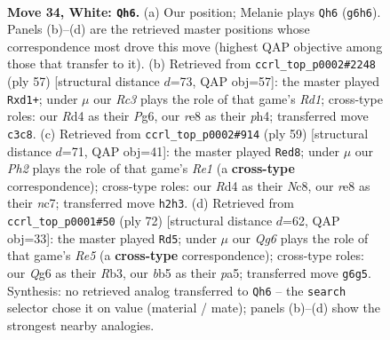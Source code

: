 \documentclass[11pt]{article}
\begin{document}
\clearpage

\begin{figure}[p]\centering
\begin{subfigure}{0.46\textwidth}\centering
\resizebox{\linewidth}{!}{%
\newchessgame
\chessboard[
  setfen={4rn2/kp2p3/1r1p2Q1/1b4p1/3RP3/1PR2P2/6PP/1K6 w - - 1 34},
  showmover=false,
  pgfstyle=straightmove, color=movearrow, markmove={g6-h6}
]}
\caption{}
\end{subfigure}\hfill
\begin{subfigure}{0.46\textwidth}\centering
\resizebox{\linewidth}{!}{%
\newchessgame
\chessboard[
  setfen={3r2k1/pp3pp1/6p1/6P1/1P2pq1P/8/P3NPB1/R2R1K2 b - - 1 29},
  showmover=false,
  pgfstyle=straightmove, color=movearrow, markmove={d8-d1}
]}
\caption{}
\end{subfigure}
\\[4pt]
\begin{subfigure}{0.46\textwidth}\centering
\resizebox{\linewidth}{!}{%
\newchessgame
\chessboard[
  setfen={2n1r1k1/1pNr2pp/p2P4/4pp2/8/5P2/1P4PP/2RR2K1 b - - 6 30},
  showmover=false,
  pgfstyle=straightmove, color=movearrow, markmove={e8-d8}
]}
\caption{}
\end{subfigure}\hfill
\begin{subfigure}{0.46\textwidth}\centering
\resizebox{\linewidth}{!}{%
\newchessgame
\chessboard[
  setfen={1r4k1/1r4p1/5p1p/pp2R3/8/PR2P2P/5PP1/7K w - - 0 37},
  showmover=false,
  pgfstyle=straightmove, color=movearrow, markmove={e5-d5}
]}
\caption{}
\end{subfigure}
\caption{\textbf{Move 34, White: \texttt{Qh6}.} (a) Our position; Melanie plays \texttt{Qh6} (\texttt{g6h6}). Panels (b)--(d) are the retrieved master positions whose correspondence most drove this move (highest QAP objective among those that transfer to it). (b) Retrieved from \texttt{ccrl\_top\_p0002\#2248} (ply 57) [structural distance $d$=73, QAP obj=57]: the master played \texttt{Rxd1+}; under $\mu$ our \emph{Rc3} plays the role of that game's \emph{Rd1}; cross-type roles: our \emph{R}d4 as their \emph{P}g6, our \emph{r}e8 as their \emph{p}h4; transferred move \texttt{c3c8}. (c) Retrieved from \texttt{ccrl\_top\_p0002\#914} (ply 59) [structural distance $d$=71, QAP obj=41]: the master played \texttt{Red8}; under $\mu$ our \emph{Ph2} plays the role of that game's \emph{Re1} (a \textbf{cross-type} correspondence); cross-type roles: our \emph{R}d4 as their \emph{N}c8, our \emph{r}e8 as their \emph{n}c7; transferred move \texttt{h2h3}. (d) Retrieved from \texttt{ccrl\_top\_p0001\#50} (ply 72) [structural distance $d$=62, QAP obj=33]: the master played \texttt{Rd5}; under $\mu$ our \emph{Qg6} plays the role of that game's \emph{Re5} (a \textbf{cross-type} correspondence); cross-type roles: our \emph{Q}g6 as their \emph{R}b3, our \emph{b}b5 as their \emph{p}a5; transferred move \texttt{g6g5}. Synthesis: no retrieved analog transferred to \texttt{Qh6} -- the \texttt{search} selector chose it on value (material / mate); panels (b)--(d) show the strongest nearby analogies.}
\label{fig:thought-m66}
\end{figure}
\end{document}
